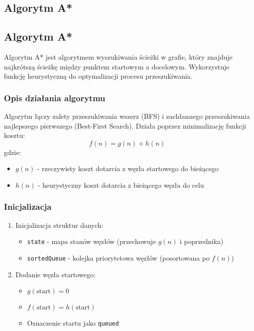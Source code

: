 \documentclass[../../../../doc.tex]{subfiles}
\begin{document}
\subsection{Algorytm A*}
\subsection{Algorytm A*}

Algorytm A* jest algorytmem wyszukiwania ścieżki w grafie, który znajduje najkrótszą ścieżkę między punktem startowym a docelowym. Wykorzystuje funkcję heurystyczną do optymalizacji procesu przeszukiwania.

\subsubsection{Opis działania algorytmu}

Algorytm łączy zalety przeszukiwania wszerz (BFS) i zachłannego przeszukiwania najlepszego pierwszego (Best-First Search). Działa poprzez minimalizację funkcji kosztu:
\[
  f(n) = g(n) + h(n)
\]
gdzie:
\begin{itemize}
  \item $g(n)$ - rzeczywisty koszt dotarcia z węzła startowego do bieżącego
  \item $h(n)$ - heurystyczny koszt dotarcia z bieżącego węzła do celu
\end{itemize}

\subsubsection{Inicjalizacja}
\begin{enumerate}
  \item Inicjalizacja struktur danych:
        \begin{itemize}
          \item \texttt{state} - mapa stanów węzłów (przechowuje $g(n)$ i poprzednika)
          \item \texttt{sortedQueue} - kolejka priorytetowa węzłów (posortowana po $f(n)$)
        \end{itemize}
  \item Dodanie węzła startowego:
        \begin{itemize}
          \item $g(\text{start}) = 0$
          \item $f(\text{start}) = h(\text{start})$
          \item Oznaczenie startu jako \texttt{queued}
        \end{itemize}
\end{enumerate}
\end{document}
